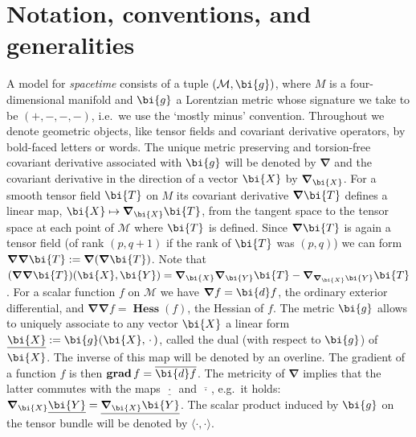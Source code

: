 \documentclass
[rmp,aps,twocolumn,showpacs,preprintnumbers,amsmath,amssymb]{revtex4}
\theoremstyle{plain}
\theoremstyle{definition}
\theoremstyle{remark}
\newcommand{\ul}[1]{\underline{#1}}
\newcommand{\br}[1]{\mathbf{#1}}              %
\newcommand{\sprod}[2]{\langle#1,#2\rangle}   %
\DeclareMathOperator{\Grad}{\br{grad}}        %
\DeclareMathOperator{\Hess}{\br{Hess}}        %
\newcommand{\bnabla}{\boldsymbol{\nabla}}     %
\newcommand{\ed}{\bi{d}}                      %
\newcommand{\M}{\mathcal{M}}                      %
\newcommand{\g}{\bg}                            %
\newcommand{\bg}{\bi{g}}
\newcommand{\bT}{\bi{T}}
\newcommand{\bX}{\bi{X}}
\newcommand{\bY}{\bi{Y}}
\begin{document}
\section{Notation, conventions, and generalities}
%
A model for \emph{spacetime} consists of a tuple $(\M,\g)$, where $M$ is 
a four-dimensional manifold and $\g$ a Lorentzian metric whose signature 
we take to be $(+,-,-,-)$, i.e.~we use the `mostly minus' convention. 
Throughout we denote geometric objects, like tensor fields and covariant 
derivative operators, by bold-faced letters or words. The unique metric 
preserving and torsion-free covariant derivative associated with $\g$ will 
be denoted by $\bnabla$ and the covariant derivative in the direction 
of a vector $\bX$ by $\bnabla_\bX$. For a smooth tensor field $\bT$ on 
$M$ its covariant derivative $\bnabla\bT$ defines a linear map, 
$\bX\mapsto\bnabla_\bX\bT$, from the tangent space to the tensor space at 
each point of $\M$ where $\bT$ is defined. Since $\bnabla\bT$ is 
again a tensor field (of rank $(p,q+1)$ if the rank of $\bT$ was 
$(p,q)$) we can form $\bnabla\bnabla\bT:=\bnabla(\bnabla\bT)$. 
Note that $(\bnabla\bnabla\bT)(\bX,\bY)=\bnabla_\bX\bnabla_\bY\bT
-\bnabla_{\bnabla_\bX\bY}\bT$. For a scalar function $f$ on $\M$ 
we have $\bnabla f=\ed f$, the ordinary exterior differential, and 
$\bnabla\bnabla f=\Hess(f)$, the Hessian of $f$.  
The metric $\g$ allows to uniquely associate to any vector 
$\bX$ a linear form $\ul\bX:=\g(\bX,\,\cdot\,)$, called the 
dual (with respect to $\g$) of $\bX$. The inverse of this map will be 
denoted by an overline. The gradient of a function $f$ 
is then $\Grad f = \overline{\ed f}$. The metricity of $\bnabla$ 
implies that the latter commutes with the maps $\ul{\,\cdot\,}$ and 
$\overline{\,\cdot\,}$, e.g.~it holds: $\bnabla_\bX\ul\bY=\ul{\bnabla_\bX\bY}$. 
The scalar product induced by $\g$ on the tensor bundle will be denoted 
by $\sprod{\cdot}{\cdot}$. 
\end{document}
